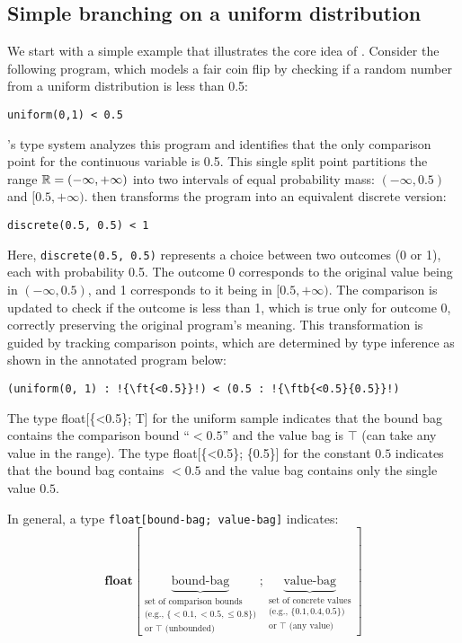 \documentclass[acmsmall,screen,dvipsnames,x11names,nonacm,anonymous,review]{acmart}
\newcommand{\codetype}[1]{\textcolor{typecolor}{\ttfamily\small#1}}
\newcommand{\ftb}[2]{\codetype{float[\{#1\}; \{#2\}]}}  %
\newcommand{\ft}[1]{\codetype{float[\{#1\}; T]}}        %
\begin{document}
\subsection{Simple branching on a uniform distribution}

We start with a simple example that illustrates the core idea of \Slice{}. Consider the following program, which models a fair coin flip by checking if a random number from a uniform distribution is less than 0.5:

\begin{lstlisting}[aboveskip=1em,belowskip=1em]
    uniform(0,1) < 0.5
\end{lstlisting}

\noindent \Slice{}'s type system analyzes this program and identifies that the only comparison point for the continuous variable is 0.5. This single split point partitions the range $\mathbb{R} = (-\infty, +\infty)$ into two intervals of equal probability mass: $(-\infty, 0.5)$ and $[0.5, +\infty)$. \Slice{} then transforms the program into an equivalent discrete version:

\begin{lstlisting}[aboveskip=1em,belowskip=1em]
    discrete(0.5, 0.5) < 1
\end{lstlisting}

\noindent Here, \texttt{discrete(0.5, 0.5)} represents a choice between two outcomes (0 or 1), each with probability 0.5. The outcome 0 corresponds to the original value being in $(-\infty, 0.5)$, and 1 corresponds to it being in $[0.5, +\infty)$. The comparison is updated to check if the outcome is less than 1, which is true only for outcome 0, correctly preserving the original program's meaning. This transformation is guided by tracking comparison points, which are determined by type inference as shown in the annotated program below:

\begin{lstlisting}[aboveskip=1em,belowskip=1em,escapechar=!]
    (uniform(0, 1) : !{\ft{<0.5}}!) < (0.5 : !{\ftb{<0.5}{0.5}}!)
\end{lstlisting}

The type \ft{<0.5} for the uniform sample indicates that the bound bag contains the comparison bound ``$<\!\!0.5$'' and the value bag is $\top$ (can take any value in the range). 
The type \ftb{<0.5}{0.5} for the constant $0.5$ indicates that the bound bag contains $<0.5$ and the value bag contains only the single value $0.5$.

In general, a type \lstinline{float[bound-bag; value-bag]} indicates:
\[
\textbf{float}
[
\underbrace{\text{bound-bag}}_{\begin{array}{c}\text{set of comparison bounds}\\\text{(e.g., }\{<\!0.1, <\!0.5, \leq\!0.8\}\text{)}\\\text{or }\top\text{ (unbounded)}\end{array}}
;
\underbrace{\text{value-bag}}_{\begin{array}{c}\text{set of concrete values}\\\text{(e.g., }\{0.1, 0.4, 0.5\}\text{)}\\\text{or }\top\text{ (any value)}\end{array}}
]
\]
\end{document}
